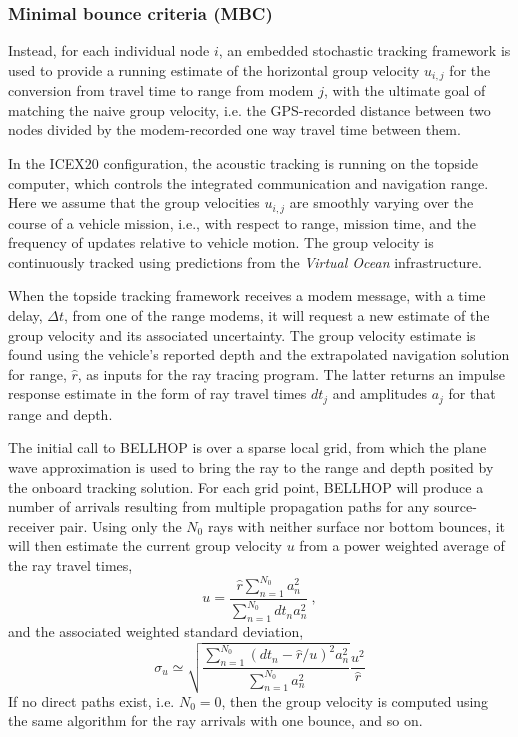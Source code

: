\subsubsection{Minimal bounce criteria (MBC)}
Instead, for each individual node $i$, an embedded stochastic tracking framework is used to provide a running estimate of the horizontal group velocity $u_{i,j}$ for the conversion from travel time to range from modem $j$, with the ultimate goal of matching the naive group velocity, i.e. the GPS-recorded distance between two nodes divided by the modem-recorded one way travel time between them. 

In the ICEX20 configuration, the acoustic tracking is running on the topside computer, which controls the integrated communication and navigation range.
Here we assume that the group velocities $u_{i,j}$ are smoothly varying over the course of a vehicle mission, i.e., with respect to range, mission time, and the frequency of updates relative to vehicle motion. 
The group velocity is continuously tracked using predictions from the \textit{Virtual Ocean} infrastructure.

When the topside tracking framework receives a modem message, with a time delay, $\Delta t$, from one of the range modems, it will request a new estimate of the group velocity and its associated uncertainty.
The group velocity estimate is found using the vehicle's reported depth and the extrapolated navigation solution for range, $\hat{r}$, as inputs for the ray tracing program. The latter returns an impulse response estimate in the form of ray travel times $dt_{j}$ and amplitudes $a_{j}$ for that range and depth.

The initial call to BELLHOP is over a sparse local grid, from which the plane wave approximation is used to bring the ray to the range and depth posited by the onboard tracking solution.
For each grid point, BELLHOP will produce a number of arrivals resulting from multiple propagation paths for any source-receiver pair.
Using only the $N_0$ rays with neither surface nor bottom bounces, it will then estimate the current group velocity $u$ from a power weighted average of the ray travel times,
\begin{equation}
u = \frac{\hat{r} \sum_{n=1}^{N_{0}} a_{n}^{2}}{\sum_{n=1}^{N_{0}} dt_{n}a_{n}^{2}} ~, 
\end{equation}
and the associated weighted standard deviation,
\begin{equation}
\sigma_{u} \simeq \sqrt{\frac {\sum_{n=1}^{N_{0}} (dt_{n}-\hat{r}/u)^{2}a_{n}^{2}}{ \sum_{n=1}^{N_{0}} a_{n}^{2}} } \frac{u^{2}}{\hat{r}}
\end{equation}
If no direct paths exist, i.e. $N_{0}=0$, then the group velocity is computed using the same algorithm for the ray arrivals with one bounce, and so on.

